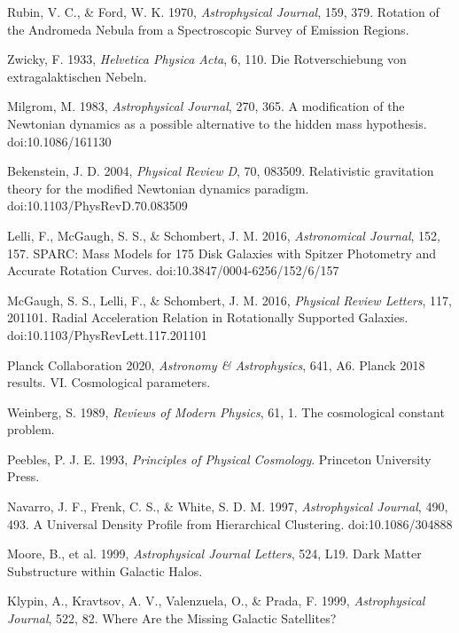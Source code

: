\documentclass[12pt,a4paper]{article}
\begin{document}
\begin{thebibliography}{99}

 Rubin, V. C., \& Ford, W. K. 1970, \textit{Astrophysical Journal}, 159, 379. Rotation of the Andromeda Nebula from a Spectroscopic Survey of Emission Regions.

 Zwicky, F. 1933, \textit{Helvetica Physica Acta}, 6, 110. Die Rotverschiebung von extragalaktischen Nebeln.

 Milgrom, M. 1983, \textit{Astrophysical Journal}, 270, 365. A modification of the Newtonian dynamics as a possible alternative to the hidden mass hypothesis. doi:10.1086/161130

 Bekenstein, J. D. 2004, \textit{Physical Review D}, 70, 083509. Relativistic gravitation theory for the modified Newtonian dynamics paradigm. doi:10.1103/PhysRevD.70.083509

 Lelli, F., McGaugh, S. S., \& Schombert, J. M. 2016, \textit{Astronomical Journal}, 152, 157. SPARC: Mass Models for 175 Disk Galaxies with Spitzer Photometry and Accurate Rotation Curves. doi:10.3847/0004-6256/152/6/157

 McGaugh, S. S., Lelli, F., \& Schombert, J. M. 2016, \textit{Physical Review Letters}, 117, 201101. Radial Acceleration Relation in Rotationally Supported Galaxies. doi:10.1103/PhysRevLett.117.201101

 Planck Collaboration 2020, \textit{Astronomy \& Astrophysics}, 641, A6. Planck 2018 results. VI. Cosmological parameters.

 Weinberg, S. 1989, \textit{Reviews of Modern Physics}, 61, 1. The cosmological constant problem.

 Peebles, P. J. E. 1993, \textit{Principles of Physical Cosmology}. Princeton University Press.

 Navarro, J. F., Frenk, C. S., \& White, S. D. M. 1997, \textit{Astrophysical Journal}, 490, 493. A Universal Density Profile from Hierarchical Clustering. doi:10.1086/304888

 Moore, B., et al. 1999, \textit{Astrophysical Journal Letters}, 524, L19. Dark Matter Substructure within Galactic Halos.

 Klypin, A., Kravtsov, A. V., Valenzuela, O., \& Prada, F. 1999, \textit{Astrophysical Journal}, 522, 82. Where Are the Missing Galactic Satellites?


\end{thebibliography}
\end{document}
